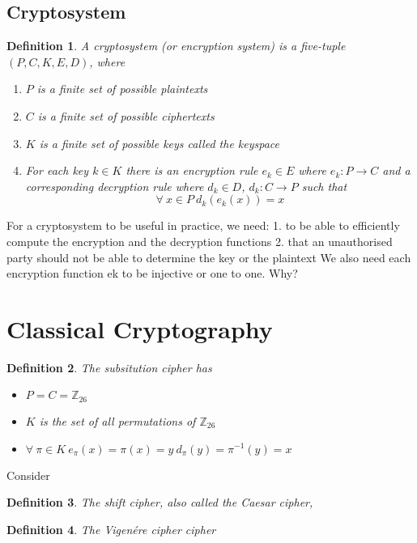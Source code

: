 \documentclass{article}
\theoremstyle{quest}
\newtheorem*{definition}{Definition}
\newcommand{\Z}{\mathbb{Z}}
\begin{document}
\subsection{Cryptosystem}
\begin{definition}
	A \textit{cryptosystem} (or encryption system) is a five-tuple $(P,C,K,E,D)$, where
	\begin{enumerate}
		\item $P$ is a finite set of possible plaintexts
		\item $C$ is a finite set of possible ciphertexts
		\item $K$ is a finite set of possible keys called the keyspace
		\item For each key $k \in K$
			there is an encryption rule $e_k \in E$ where $e_k : P \rightarrow C$
			and a corresponding decryption rule where $d_k \in D$, $d_k : C \rightarrow P$
			such that
			$$\forall\ x \in P\ d_k(e_k(x)) = x$$
		\end{enumerate}
\end{definition}

For a cryptosystem to be useful in practice, we need:
1. to be able to efficiently compute the encryption and the decryption functions
2. that an unauthorised party should not be able to determine the key or the plaintext
We also need each encryption function ek to be injective or one to one. Why?

\pagebreak
\section{Classical Cryptography}
\begin{definition}
	The \textit{subsitution cipher} has
	\begin{itemize}
		\item $P = C = \Z_{26}$
		\item $K$ is the set of all permutations of $\Z_{26}$
		\item
			$
			\forall\ \pi \in K
			\ e_\pi(x) = \pi(x) = y
			\ d_\pi(y) = \pi^{-1}(y) = x
			$
	\end{itemize}
\end{definition}

Consider

\begin{definition}
	The \textit{shift cipher}, also called the Caesar cipher,
\end{definition}

\begin{definition}
	The \textit{Vigen\'ere cipher cipher}
\end{definition}
\end{document}
